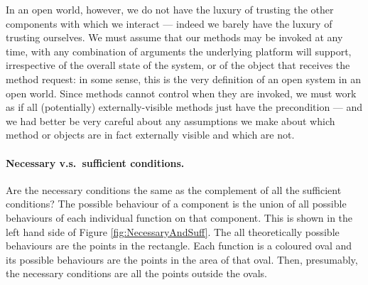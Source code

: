 In an open world, however, we do not have the luxury of trusting the
other components with which we interact --- indeed we barely have the
luxury of trusting ourselves.  We must assume that our methods may be
invoked at any time, with any combination of arguments the underlying
platform will support, irrespective of the overall state of the
system, or of the object that receives the method request: in some
sense, this is the very definition of an open system in an open world.
Since methods cannot control when they are invoked, we must work
as if all (potentially) externally-visible methods just have the precondition
 --- and we had better be very careful about any assumptions
we make about which method or objects are in fact externally visible
and which are not.  






\paragraph{Necessary v.s.\ sufficient conditions.}

Are the necessary conditions the same as the complement of all the
sufficient conditions?  The possible behaviour of a component is the
union of all possible behaviours of each individual function on that
component.  This is shown in the left hand side of
Figure \ref{fig:NecessaryAndSuff}. The all theoretically possible
behaviours are the points in the rectangle.  Each function is a
coloured oval and its possible behaviours are the points in the area
of that oval.  Then, presumably, the necessary conditions are all the
points outside the ovals.

